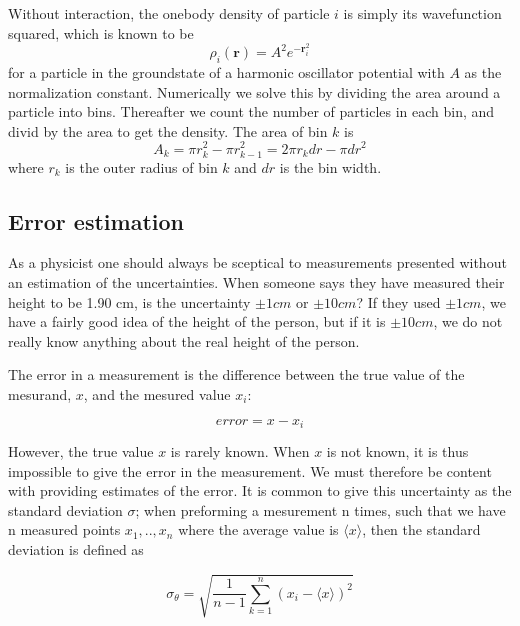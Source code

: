 \documentclass[norsk,a4paper,12pt]{article}
\begin{document}
Without interaction, the onebody density of particle $i$ is simply its wavefunction squared, which is known to be
\begin{equation}
\rho_i(\boldsymbol{r})=A^2e^{-\boldsymbol{r}_i^2}
\end{equation}
for a particle in the groundstate of a harmonic oscillator potential with $A$ as the normalization constant. Numerically we solve this by dividing the area around a particle into bins. Thereafter we count the number of particles in each bin, and divid by the area to get the density. The area of bin $k$ is
\begin{equation}
A_k=\pi r_k^2-\pi r_{k-1}^2=2\pi r_kdr-\pi dr^2
\end{equation}
where $r_k$ is the outer radius of bin $k$ and $dr$ is the bin width.

\subsection{Error estimation} \label{sec:error_estimation}
As a physicist one should always be sceptical to measurements presented without an estimation of the uncertainties. When someone says they have measured their height to be 1.90 cm, is the uncertainty $\pm 1 cm$ or $\pm 10 cm$? If they used $\pm 1 cm$, we have a fairly good idea of the height of the person, but if it is $\pm 10 cm$, we do not really know anything about the real height of the person. 
\par 
\vspace{3mm}
The error in a measurement is the difference between the true value of the mesurand, $x$, and the mesured value $x_i$:

\begin{equation}
	error = x - x_i
\end{equation}

However, the true value $x$ is rarely known. When $x$ is not known, it is thus impossible to give the error in the measurement. We must therefore be content with providing estimates of the error. It is common to give this uncertainty as the standard deviation $\sigma$; when preforming a mesurement n times, such that we have n measured points $x_1, .., x_n$ where the average value is $ \langle x \rangle $, then the standard deviation is defined as

\begin{equation}
\label{eq:standard_dev}
\sigma_{\theta} =  \sqrt{\frac{1}{n-1} \sum_{k=1}^n (x_i - \langle x \rangle)^2}
\end{equation}
\end{document}
